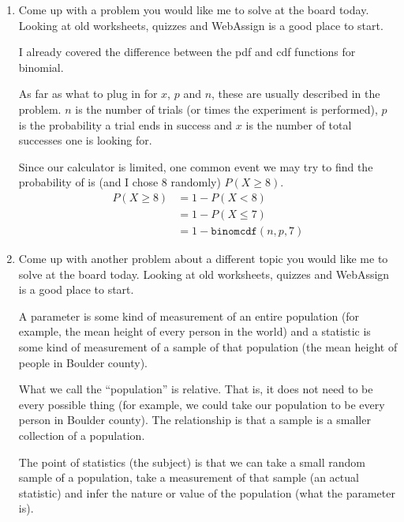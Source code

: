 \documentclass{article}
\newcommand{\answer}[1]{\color{red}#1}
\begin{document}
{{{\begin{enumerate} 

\item Come up with a problem you would like me to solve at the board today. Looking at old worksheets, quizzes and WebAssign is a good place to start.

{\answer I already covered the difference between the pdf and cdf functions for binomial.

As far as what to plug in for $x$, $p$ and $n$, these are usually described in the problem. $n$ is the number of trials (or times the experiment is performed), $p$ is the probability a trial ends in success and $x$ is the number of total successes one is looking for.

Since our calculator is limited, one common event we may try to find the probability of is (and I chose 8 randomly) $P(X \geq 8)$. 
\begin{align*}
P(X\geq 8) &= 1 - P(X<8) \\
&= 1 - P(X\leq 7) \\
&= 1- \texttt{binomcdf}(n,p,7)\end{align*}}

\item Come up with another problem about a different topic you would like me to solve at the board today. Looking at old worksheets, quizzes and WebAssign is a good place to start. 

{\answer A parameter is some kind of measurement of an entire population (for example, the mean height of every person in the world) and a statistic is some kind of measurement of a sample of that population (the mean height of people in Boulder county).

What we call the ``population'' is relative. That is, it does not need to be every possible thing (for example, we could take our population to be every person in Boulder county). The relationship is that a sample is a smaller collection of a population.

The point of statistics (the subject) is that we can take a small random sample of a population, take a measurement of that sample (an actual statistic) and infer the nature or value of the population (what the parameter is).}

\end{enumerate}





\begin{center}
\textbf{}
\end{center}

}}}
\end{document}
